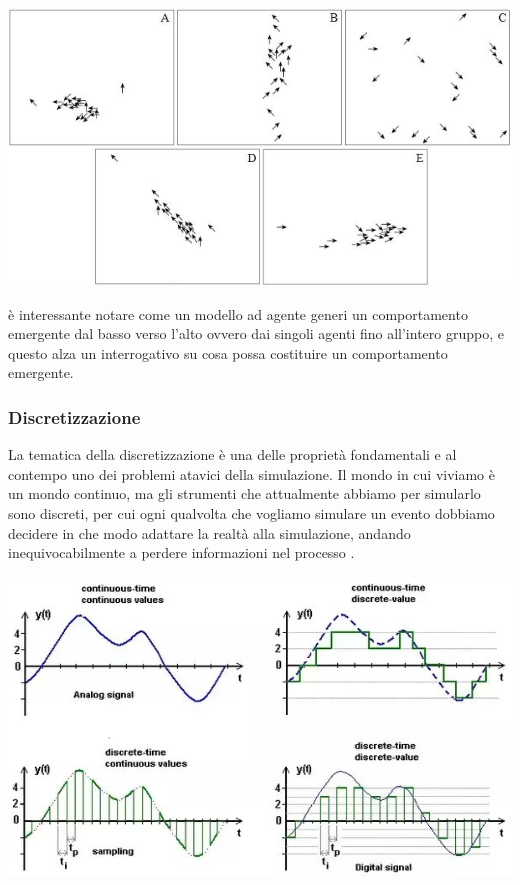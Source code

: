\begin{minipage}{\linewidth}
    \centering
    \includegraphics{img/Figure6b.jpg}
    \label{fig:flock_emergent_behaviour}
\end{minipage}

è interessante notare come un modello ad agente generi un comportamento emergente dal basso 
verso l'alto ovvero dai singoli agenti fino all'intero gruppo, e questo alza un interrogativo 
su cosa possa costituire un comportamento emergente. 

\subsubsection{Discretizzazione}
La tematica della discretizzazione è una delle proprietà fondamentali
e al contempo uno dei problemi atavici della simulazione.
Il mondo in cui viviamo è un mondo continuo, ma gli strumenti
che attualmente abbiamo per simularlo sono discreti, per cui 
ogni qualvolta che vogliamo simulare un evento dobbiamo decidere 
in che modo adattare la realtà alla simulazione, andando 
inequivocabilmente a perdere informazioni nel processo 
\cite{KONSTANTINOUDIS2020100319}. 

\begin{minipage}{\linewidth}
    \centering
    \includegraphics[scale=0.5]{img/main-qimg-100fc99cfe855462247225a07e1dfb7e-pjlq.jpg}
    \label{fig:discretization}
\end{minipage}

